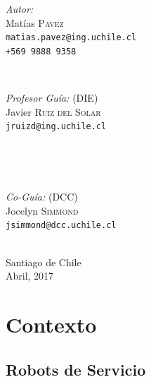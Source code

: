 \documentclass[12pt,letterpaper,spanish]{article}
\begin{document}
\begin{titlepage}
\begin{minipage}{0.4\textwidth}
\begin{flushleft} \large
\emph{Autor:}\\
Mat\'ias \textsc{Pavez}\\
\texttt{\normalsize matias.pavez@ing.uchile.cl} \\
\texttt{\normalsize +569 9888 9358}
\end{flushleft}
\end{minipage}
~
\begin{minipage}{0.4\textwidth}
\begin{flushright} \large
\emph{Profesor Gu\'ia:} (DIE) \\
Javier \textsc{Ruiz del Solar}\\
\texttt{\normalsize jruizd@ing.uchile.cl}
\end{flushright}
\end{minipage}\\[1cm]
\begin{minipage}{0.4\textwidth}
\begin{flushleft}\end{flushleft}
\end{minipage}
~
\begin{minipage}{0.4\textwidth}
\begin{flushright} \large
\emph{Co-Gu\'ia:} (DCC)\\
Jocelyn \textsc{Simmond}\\
\texttt{\normalsize jsimmond@dcc.uchile.cl}
\end{flushright}
\end{minipage}\\[2cm]
{\large Santiago de Chile}\\
{\large Abril, 2017}
\vfill
 
\end{titlepage}


\section{Contexto}


\subsection{Robots de Servicio}
\end{document}
